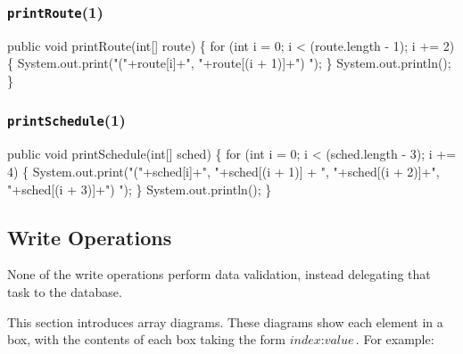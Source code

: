 \documentclass{article}
\def\nwendcode{\endtrivlist \endgroup}
\let\nwdocspar=\par
\theoremstyle{definition}
\begin{document}
\subsubsection{{\tt{}\protect{}printRoute}(1)}
\nwenddocs{}\endmoddef{}
public void printRoute(int[] route) \{
  for (int i = 0; i < (route.length - 1); i += 2) \{
    System.out.print("("+route[i]+", "+route[(i + 1)]+") ");
  \}
  System.out.println();
\}
\eatline
{}\nwendcode{}\nwdocspar
\subsubsection{{\tt{}\protect{}printSchedule}(1)}
\nwenddocs{}\endmoddef{}
public void printSchedule(int[] sched) \{
  for (int i = 0; i < (sched.length - 3); i += 4) \{
    System.out.print("("+sched[i]+", "+sched[(i + 1)]
      + ", "+sched[(i + 2)]+", "+sched[(i + 3)]+") ");
  \}
  System.out.println();
\}
\eatline
{}\nwendcode{}\nwdocspar
\subsection{Write Operations}
\label{sec:write-operations}
None of the write operations perform data validation, instead
delegating that task to the database.

This section introduces array diagrams. These diagrams show each element
in a box, with the contents of each box taking the form
$\textit{index}:\textit{value}$. For example:

\begin{figure}[h]
\centering
{}
\end{figure}
\end{document}
